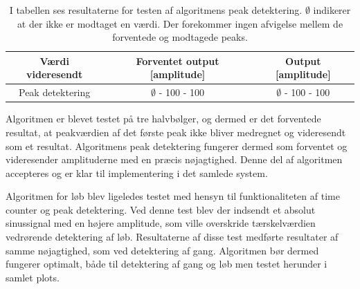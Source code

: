 \begin{table}[H]
	\centering
	\begin{tabular}{ccc}
		\hline
		\rowcolor[HTML]{C0C0C0} 
		Værdi videresendt & Forventet output [amplitude] & Output [amplitude] \\ \hline
		Peak detektering & $\emptyset$ - 100 - 100 & $\emptyset$ - 100 - 100 \\ \hline
	\end{tabular}
	\caption{I tabellen ses resultaterne for testen af algoritmens peak detektering. $\emptyset$ indikerer at der ikke er modtaget en værdi. Der forekommer ingen afvigelse mellem de forventede og modtagede peaks.}
	\label{tab:test_res_peak}
\end{table}\vspace{-0.25cm}
Algoritmen er blevet testet på tre halvbølger, og dermed er det forventede resultat, at peakværdien af det første peak ikke bliver medregnet og videresendt som et resultat. Algoritmens peak detektering fungerer dermed som forventet og videresender amplituderne med en præcis nøjagtighed. Denne del af algoritmen accepteres og er klar til implementering i det samlede system.

Algoritmen for løb blev ligeledes testet med hensyn til funktionaliteten af time counter og peak detektering. Ved denne test blev der indsendt et absolut sinussignal med en højere amplitude, som ville overskride tærskelværdien vedrørende detektering af løb. Resultaterne af disse test medførte resultater af samme nøjagtighed, som ved detektering af gang. Algoritmen bør dermed fungerer optimalt, både til detektering af gang og løb men testet herunder i samlet plots.

